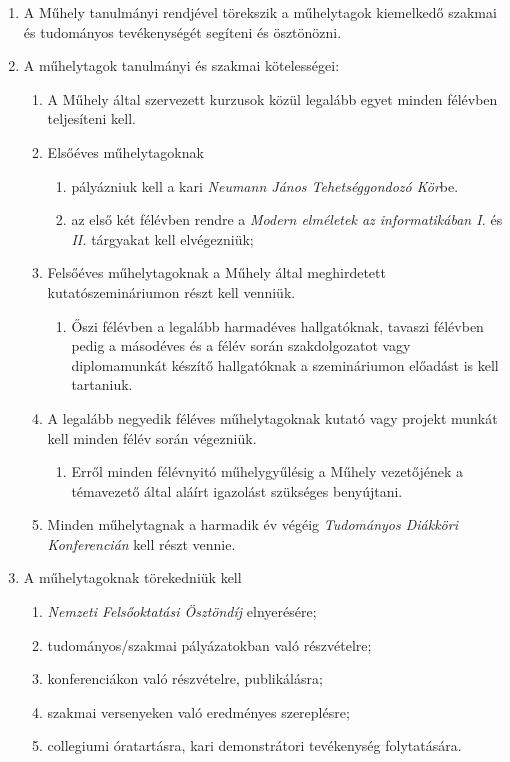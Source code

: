 \documentclass{../styles/rulebook}
\begin{document}
\begin{enumerate}
\item A Műhely tanulmányi rendjével törekszik a műhelytagok kiemelkedő szakmai és tudományos tevékenységét segíteni és ösztönözni.
\item A műhelytagok tanulmányi és szakmai kötelességei:
	\begin{enumerate}
		\item A Műhely által szervezett kurzusok közül legalább egyet minden félévben teljesíteni kell.
		\item Elsőéves műhelytagoknak
		\begin{enumerate}
			\item pályázniuk kell a kari \emph{Neumann János Tehetséggondozó Kör}be.
			\item az első két félévben rendre a \emph{Modern elméletek az informatikában I.} és \emph{II.} tárgyakat kell elvégezniük;
		\end{enumerate}
		\item Felsőéves műhelytagoknak a Műhely által meghirdetett kutatószemináriumon részt kell venniük. 
		\begin{enumerate}
		    \item Őszi félévben a legalább harmadéves hallgatóknak, tavaszi félévben pedig a másodéves és a félév során szakdolgozatot vagy diplomamunkát készítő hallgatóknak a szemináriumon előadást is kell tartaniuk.
		\end{enumerate}
		\item A legalább negyedik féléves műhelytagoknak kutató vagy projekt munkát kell minden félév során végezniük.
		\begin{enumerate}
		    \item Erről minden félévnyitó műhelygyűlésig a Műhely vezetőjének a témavezető által aláírt igazolást szükséges benyújtani.
		\end{enumerate}
		\item Minden műhelytagnak a harmadik év végéig \emph{Tudományos Diákköri Konferencián} kell részt vennie.
	\end{enumerate}
\item A műhelytagoknak törekedniük kell
	\begin{enumerate}
		\item \emph{Nemzeti Felsőoktatási Ösztöndíj} elnyerésére;
		\item tudományos/szakmai pályázatokban való részvételre;
		\item konferenciákon való részvételre, publikálásra;
		\item szakmai versenyeken való eredményes szereplésre;
		\item collegiumi óratartásra, kari demonstrátori tevékenység folytatására.
	\end{enumerate}
\end{enumerate}
\end{document}
